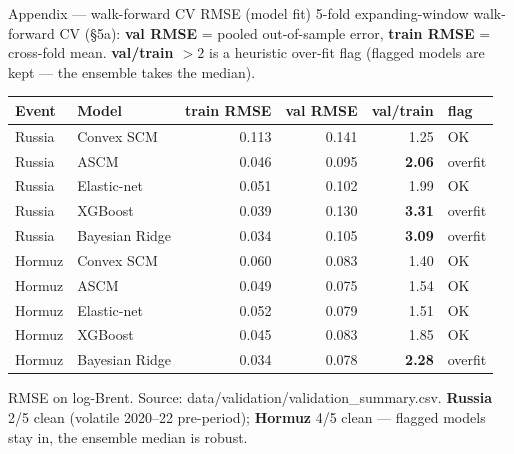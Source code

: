 \documentclass[aspectratio=169,11pt]{beamer}
\newcommand{\smalltext}[1]{{\footnotesize\textcolor{muted}{#1}}}
\newcommand{\hd}[1]{\textbf{#1}}
\begin{document}
\begin{frame}{Appendix --- walk-forward CV RMSE (model fit)}
  \footnotesize
  5-fold expanding-window walk-forward CV (§5a): \hd{val RMSE} = pooled out-of-sample error, \hd{train
  RMSE} = cross-fold mean. \hd{val/train $>2$} is a heuristic over-fit flag (flagged models are kept ---
  the ensemble takes the median).

  \vspace{0.15em}
  \begin{center}
  \renewcommand{\arraystretch}{0.92}
  \begin{tabular}{@{}l l r r r l@{}}
    \toprule
    \hd{Event} & \hd{Model} & \hd{train RMSE} & \hd{val RMSE} & \hd{val/train} & \hd{flag} \\
    \midrule
    Russia & Convex SCM     & 0.113 & 0.141 & 1.25          & OK \\
    Russia & ASCM           & 0.046 & 0.095 & \textbf{2.06} & overfit \\
    Russia & Elastic-net    & 0.051 & 0.102 & 1.99          & OK \\
    Russia & XGBoost        & 0.039 & 0.130 & \textbf{3.31} & overfit \\
    Russia & Bayesian Ridge & 0.034 & 0.105 & \textbf{3.09} & overfit \\
    \midrule
    Hormuz & Convex SCM     & 0.060 & 0.083 & 1.40          & OK \\
    Hormuz & ASCM           & 0.049 & 0.075 & 1.54          & OK \\
    Hormuz & Elastic-net    & 0.052 & 0.079 & 1.51          & OK \\
    Hormuz & XGBoost        & 0.045 & 0.083 & 1.85          & OK \\
    Hormuz & Bayesian Ridge & 0.034 & 0.078 & \textbf{2.28} & overfit \\
    \bottomrule
  \end{tabular}
  \end{center}
  \smalltext{RMSE on log-Brent. Source: data/validation/validation\_summary.csv. \quad
  \hd{Russia} 2/5 clean (volatile 2020--22 pre-period); \hd{Hormuz} 4/5 clean --- flagged models stay in, the ensemble median is robust.}
\end{frame}
\end{document}
